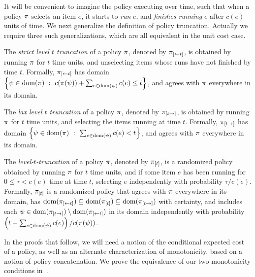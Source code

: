 It will be convenient to imagine the policy executing over time, such that 
when a policy $\pi$ selects an item $e$, it starts to \emph{run} $e$, and \emph{finishes running} $e$ after  
$c(e)$ units of time.
We next generalize the definition of policy truncation.  Actually we require three such generalizations, which are all equivalent in the unit cost case.
%
%

\begin{definition} \label{def:strict-prune}
The \emph{strict level $t$ truncation} of a policy $\pi$, denoted by
$ \pi_{[\gets{t}] }$, is obtained by running $\pi$ for $t$ time units, and 
unselecting items whose runs have not finished by time $t$.
%
Formally, $ \pi_{[\gets{t}] }$ has domain 
$\set{\prlz \in \dom(\policy) \ : \ c(\policy(\prlz)) + \sum_{e \in \dom(\prlz)} c(e) \le t}$, 
and agrees with $\pi$ everywhere in its domain.
\end{definition}


\begin{definition} \label{def:lax-prune}
The \emph{lax level $t$ truncation} of a policy $\pi$, denoted by
$ \pi_{[{t}\to]}$, is obtained by running $\pi$ for $t$ time units, and 
selecting the items running at time $t$.
Formally, $ \pi_{[{t}\to]}$ has domain 
$\set{\prlz \in \dom(\policy) \ : \ \sum_{e \in \dom(\prlz)} c(e) < t}$, 
and agrees with $\pi$ everywhere in its domain.
\end{definition}


\begin{definition} \label{def:policy-truncation-with-costs}
  The \emph{level-$t$-truncation} of a policy $\pi$, denoted by
  $ \pi_{[{t}]} $, is a randomized policy obtained by
  running $\pi$ for $t$ time units, and 
  if some item $e$ has been running for $0 \le \tau < c(e)$ time at time $t$, 
  selecting $e$ independently with probability $\tau/c(e)$.
  Formally, $ \pi_{[{t}]} $ is a randomized policy that agrees with $\pi$
  everywhere in its domain, has 
  $\operatorname{dom}( \pi_{[\gets{t}] }) \subseteq \operatorname{dom}( \pi_{[{t}]} ) \subseteq \operatorname{dom}( \pi_{[{t}\to]})$ with certainty,  and  includes each ${\color{black}{\ensuremath{\psi}}} \in \operatorname{dom}( \pi_{[{t}\to]}) \setminus \operatorname{dom}( \pi_{[\gets{t}] })$
 in its domain 
%
independently with probability $ \left( {t - \sum_{e \in \operatorname{dom}({\color{black}{\ensuremath{\psi}}})} c(e)} \right) /c(\pi({\color{black}{\ensuremath{\psi}}}))$.
\end{definition}

In the proofs that follow, we will need a notion of the conditional
expected cost of a policy, as well as an alternate characterization of
\term monotonicity, based on a notion of policy concatenation.
We prove the equivalence of our two \term monotonicity conditions in~.

